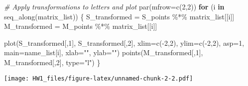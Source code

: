 \documentclass[
]{article}
\newenvironment{Shaded}{\begin{snugshade}}{\end{snugshade}}
\newcommand{\AttributeTok}[1]{\textcolor[rgb]{0.77,0.63,0.00}{#1}}
\newcommand{\CommentTok}[1]{\textcolor[rgb]{0.56,0.35,0.01}{\textit{#1}}}
\newcommand{\ControlFlowTok}[1]{\textcolor[rgb]{0.13,0.29,0.53}{\textbf{#1}}}
\newcommand{\DecValTok}[1]{\textcolor[rgb]{0.00,0.00,0.81}{#1}}
\newcommand{\FunctionTok}[1]{\textcolor[rgb]{0.00,0.00,0.00}{#1}}
\newcommand{\NormalTok}[1]{#1}
\newcommand{\OtherTok}[1]{\textcolor[rgb]{0.56,0.35,0.01}{#1}}
\newcommand{\SpecialCharTok}[1]{\textcolor[rgb]{0.00,0.00,0.00}{#1}}
\newcommand{\StringTok}[1]{\textcolor[rgb]{0.31,0.60,0.02}{#1}}
\begin{document}
\begin{Shaded}
\begin{Highlighting}[]
\CommentTok{\# Apply transformations to letters and plot}
\FunctionTok{par}\NormalTok{(}\AttributeTok{mfrow=}\FunctionTok{c}\NormalTok{(}\DecValTok{2}\NormalTok{,}\DecValTok{2}\NormalTok{))}
\ControlFlowTok{for}\NormalTok{ (i }\ControlFlowTok{in} \FunctionTok{seq\_along}\NormalTok{(matrix\_list)) \{}
\NormalTok{  S\_transformed }\OtherTok{=}\NormalTok{ S\_points }\SpecialCharTok{\%*\%}\NormalTok{ matrix\_list[[i]]}
\NormalTok{  M\_transformed }\OtherTok{=}\NormalTok{ M\_points }\SpecialCharTok{\%*\%}\NormalTok{ matrix\_list[[i]]}
  
  \FunctionTok{plot}\NormalTok{(S\_transformed[,}\DecValTok{1}\NormalTok{], S\_transformed[,}\DecValTok{2}\NormalTok{], }\AttributeTok{xlim=}\FunctionTok{c}\NormalTok{(}\SpecialCharTok{{-}}\DecValTok{2}\NormalTok{,}\DecValTok{2}\NormalTok{), }\AttributeTok{ylim=}\FunctionTok{c}\NormalTok{(}\SpecialCharTok{{-}}\DecValTok{2}\NormalTok{,}\DecValTok{2}\NormalTok{), }\AttributeTok{asp=}\DecValTok{1}\NormalTok{, }
       \AttributeTok{main=}\NormalTok{name\_list[i], }\AttributeTok{xlab=}\StringTok{""}\NormalTok{, }\AttributeTok{ylab=}\StringTok{""}\NormalTok{)}
  \FunctionTok{points}\NormalTok{(M\_transformed[,}\DecValTok{1}\NormalTok{], M\_transformed[,}\DecValTok{2}\NormalTok{], }\AttributeTok{type=}\StringTok{"l"}\NormalTok{)}
\NormalTok{\}}
\end{Highlighting}
\end{Shaded}

\texttt{[image: HW1\_files/figure-latex/unnamed-chunk-2-2.pdf]}
\end{document}
